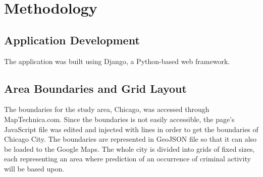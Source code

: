 
\chapter{Methodology}  %


\section{Application Development} %
    
    The application was built using Django, a Python-based web framework.


\section{Area Boundaries and Grid Layout} %

    The boundaries for the study area, Chicago, was accessed through MapTechnica.com. Since the boundaries is not easily accessible, the page’s JavaScript file was edited and injected with lines in order to get the boundaries of Chicago City. The boundaries are represented in GeoJSON file so that it can also be loaded to the Google Maps. The whole city is divided into grids of fixed sizes, each representing an area where prediction of an occurrence of criminal activity will be based upon.